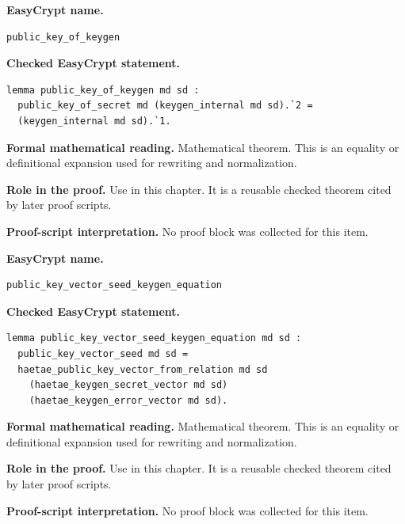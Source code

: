 \begin{formaltheorem}
\noindent\textbf{EasyCrypt name.}
\begin{lstlisting}[language=EasyCrypt,basicstyle=\ttfamily\scriptsize]
public_key_of_keygen
\end{lstlisting}
\noindent\textbf{Checked EasyCrypt statement.}
\begin{lstlisting}[language=EasyCrypt,basicstyle=\ttfamily\scriptsize]
lemma public_key_of_keygen md sd :
  public_key_of_secret md (keygen_internal md sd).`2 =
  (keygen_internal md sd).`1.
\end{lstlisting}
\noindent\textbf{Formal mathematical reading.}
Mathematical theorem. This is an equality or definitional expansion used for rewriting and normalization.

\noindent\textbf{Role in the proof.}
Use in this chapter. It is a reusable checked theorem cited by later proof scripts.

\noindent\textbf{Proof-script interpretation.}
No proof block was collected for this item.

\end{formaltheorem}

\begin{formaltheorem}
\noindent\textbf{EasyCrypt name.}
\begin{lstlisting}[language=EasyCrypt,basicstyle=\ttfamily\scriptsize]
public_key_vector_seed_keygen_equation
\end{lstlisting}
\noindent\textbf{Checked EasyCrypt statement.}
\begin{lstlisting}[language=EasyCrypt,basicstyle=\ttfamily\scriptsize]
lemma public_key_vector_seed_keygen_equation md sd :
  public_key_vector_seed md sd =
  haetae_public_key_vector_from_relation md sd
    (haetae_keygen_secret_vector md sd)
    (haetae_keygen_error_vector md sd).
\end{lstlisting}
\noindent\textbf{Formal mathematical reading.}
Mathematical theorem. This is an equality or definitional expansion used for rewriting and normalization.

\noindent\textbf{Role in the proof.}
Use in this chapter. It is a reusable checked theorem cited by later proof scripts.

\noindent\textbf{Proof-script interpretation.}
No proof block was collected for this item.

\end{formaltheorem}

